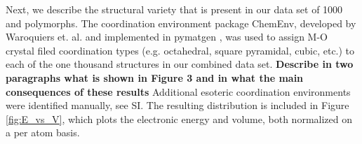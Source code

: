 %


%
Next, we describe the structural variety that is present in our data set of \mytilde\num{1000} \IrOtwo and \IrOthree polymorphs.
The coordination environment package ChemEnv, developed by Waroquiers et. al. \cite{Waroquiers2017} and implemented in pymatgen \cite{Ong2013}, was used to assign M-O crystal filed coordination types (e.g. octahedral, square pyramidal, cubic, etc.) to each of the \mytilde one thousand structures in our combined data set.
%
{\bf Describe in two paragraphs what is shown in Figure 3 and in what the main consequences of these results}
%
Additional esoteric coordination environments were identified manually, see SI.
The resulting distribution is included in Figure \ref{fig:E_vs_V}, which plots the electronic energy and volume, both normalized on a per atom basis.



